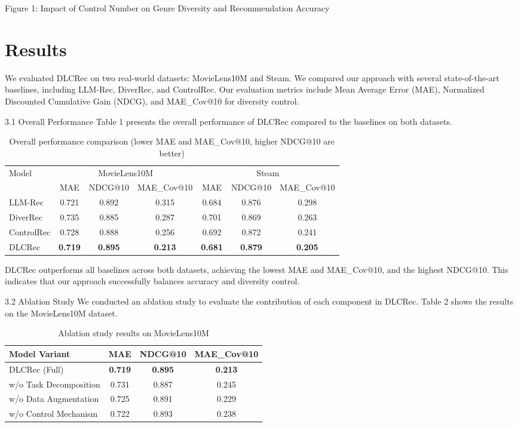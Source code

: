 \documentclass[12pt,letterpaper]{article}
\begin{document}
Figure 1: Impact of Control Number on Genre Diversity and Recommendation Accuracy

\section{Results}

We evaluated DLCRec on two real-world datasets: MovieLens10M and Steam. We compared our approach with several state-of-the-art baselines, including LLM-Rec, DiverRec, and ControlRec. Our evaluation metrics include Mean Average Error (MAE), Normalized Discounted Cumulative Gain (NDCG), and MAE_Cov@10 for diversity control.

3.1 Overall Performance
Table 1 presents the overall performance of DLCRec compared to the baselines on both datasets.

\begin{table}[h]
\centering
\begin{tabular}{|l|c|c|c|c|c|c|}
\hline
\multirow{2}{*}{Model} & \multicolumn{3}{c|}{MovieLens10M} & \multicolumn{3}{c|}{Steam} \\
\cline{2-7}
 & MAE & NDCG@10 & MAE_Cov@10 & MAE & NDCG@10 & MAE_Cov@10 \\
\hline
LLM-Rec & 0.721 & 0.892 & 0.315 & 0.684 & 0.876 & 0.298 \\
DiverRec & 0.735 & 0.885 & 0.287 & 0.701 & 0.869 & 0.263 \\
ControlRec & 0.728 & 0.888 & 0.256 & 0.692 & 0.872 & 0.241 \\
DLCRec & \textbf{0.719} & \textbf{0.895} & \textbf{0.213} & \textbf{0.681} & \textbf{0.879} & \textbf{0.205} \\
\hline
\end{tabular}
\caption{Overall performance comparison (lower MAE and MAE_Cov@10, higher NDCG@10 are better)}
\end{table}

DLCRec outperforms all baselines across both datasets, achieving the lowest MAE and MAE_Cov@10, and the highest NDCG@10. This indicates that our approach successfully balances accuracy and diversity control.

3.2 Ablation Study
We conducted an ablation study to evaluate the contribution of each component in DLCRec. Table 2 shows the results on the MovieLens10M dataset.

\begin{table}[h]
\centering
\begin{tabular}{|l|c|c|c|}
\hline
Model Variant & MAE & NDCG@10 & MAE_Cov@10 \\
\hline
DLCRec (Full) & \textbf{0.719} & \textbf{0.895} & \textbf{0.213} \\
w/o Task Decomposition & 0.731 & 0.887 & 0.245 \\
w/o Data Augmentation & 0.725 & 0.891 & 0.229 \\
w/o Control Mechanism & 0.722 & 0.893 & 0.238 \\
\hline
\end{tabular}
\caption{Ablation study results on MovieLens10M}
\end{table}
\end{document}
